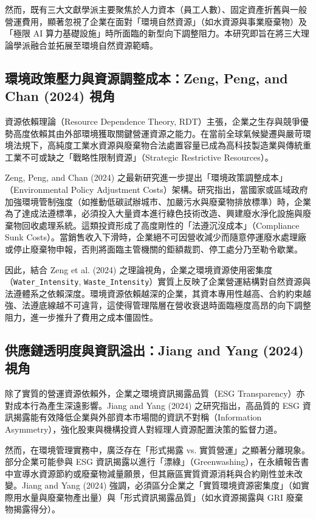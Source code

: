 \documentclass[12pt,a4paper]{article}
\begin{document}
然而，既有三大文獻學派主要聚焦於人力資本（員工人數）、固定資產折舊與一般營運費用，顯著忽視了企業在面對「環境自然資源」（如水資源與事業廢棄物）及「極限 AI 算力基礎設施」時所面臨的新型向下調整阻力。本研究即旨在將三大理論學派融合並拓展至環境自然資源範疇。

\subsection{環境政策壓力與資源調整成本：Zeng, Peng, and Chan (2024) 視角}

資源依賴理論（Resource Dependence Theory, RDT）主張，企業之生存與競爭優勢高度依賴其由外部環境獲取關鍵營運資源之能力。在當前全球氣候變遷與嚴苛環境法規下，高純度工業水資源與廢棄物合法處置容量已成為高科技製造業與傳統重工業不可或缺之「戰略性限制資源」（Strategic Restrictive Resources）。

Zeng, Peng, and Chan (2024) 之最新研究進一步提出「環境政策調整成本」（Environmental Policy Adjustment Costs）架構。研究指出，當國家或區域政府加強環境管制強度（如推動低碳試辦城市、加嚴污水與廢棄物排放標準）時，企業為了達成法遵標準，必須投入大量資本進行綠色技術改造、興建廢水淨化設施與廢棄物回收處理系統。這類投資形成了高度剛性的「法遵沉沒成本」（Compliance Sunk Costs）。當銷售收入下滑時，企業絕不可因營收減少而隨意停運廢水處理廠或停止廢棄物申報，否則將面臨主管機關的鉅額裁罰、停工處分乃至勒令歇業。

因此，結合 Zeng et al. (2024) 之理論視角，企業之環境資源使用密集度（\texttt{Water\_Intensity}, \texttt{Waste\_Intensity}）實質上反映了企業營運結構對自然資源與法遵體系之依賴深度。環境資源依賴越深的企業，其資本專用性越高、合約約束越強、法遵底線越不可違背，這使得管理階層在營收衰退時面臨極度高昂的向下調整阻力，進一步推升了費用之成本僵固性。

\subsection{供應鏈透明度與資訊溢出：Jiang and Yang (2024) 視角}

除了實質的營運資源依賴外，企業之環境資訊揭露品質（ESG Transparency）亦對成本行為產生深遠影響。Jiang and Yang (2024) 之研究指出，高品質的 ESG 資訊揭露能有效降低企業與外部資本市場間的資訊不對稱（Information Asymmetry），強化股東與機構投資人對經理人資源配置決策的監督力道。

然而，在環境管理實務中，廣泛存在「形式揭露 vs. 實質營運」之顯著分離現象。部分企業可能參與 ESG 資訊揭露以進行「漂綠」（Greenwashing），在永續報告書中宣導水資源節約或廢棄物減量願景，但其廠區實質資源消耗與合約剛性並未改變。Jiang and Yang (2024) 強調，必須區分企業之「實質環境資源密集度」（如實際用水量與廢棄物產出量）與「形式資訊揭露品質」（如水資源揭露與 GRI 廢棄物揭露得分）。
\end{document}
